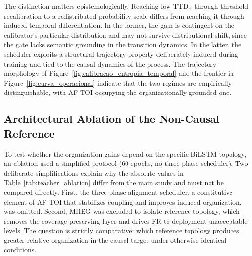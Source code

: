 \documentclass[a4paper,fleqn]{cas-dc}
\newcommand{\AFTOI}{\mbox{AF-TOI}\xspace}
\newcommand{\MHEG}{\mbox{MHEG}\xspace}
\begin{document}
The distinction matters epistemologically. Reaching low
$\mathrm{TTD}_{\mathrm{ef}}$ through threshold recalibration to a redistributed
probability scale differs from reaching it through induced temporal
differentiation. In the former, the gain is contingent on the calibrator's
particular distribution and may not survive distributional shift, since the gate
lacks semantic grounding in the transition dynamics. In the latter, the
scheduler exploits a structural trajectory property deliberately induced during
training and tied to the causal dynamics of the process. {\color{\revcolor}The
trajectory morphology of Figure~\ref{fig:calibracao_entropia_temporal} and the
frontier in Figure~\ref{fig:curva_operacional} indicate that the two regimes
are empirically distinguishable, with \AFTOI occupying the organizationally
grounded one.}
\subsection{Architectural Ablation of the Non-Causal Reference}
\label{sec:ablacao_teacher}
To test whether the organization gains depend on the specific BiLSTM topology,
an ablation used a simplified protocol (60 epochs, no three-phase scheduler).
Two deliberate simplifications explain why the absolute values in
Table~\ref{tab:teacher_ablation} differ from the main study and must not be
compared directly. First, the three-phase alignment scheduler, a constitutive
element of \AFTOI that stabilizes coupling and improves induced organization,
was omitted. Second, \MHEG was excluded to isolate reference topology, which
removes the coverage-preserving layer and drives FR to deployment-unacceptable
levels. The question is strictly comparative: which reference topology produces
greater relative organization in the causal target under otherwise identical
conditions.
\end{document}
